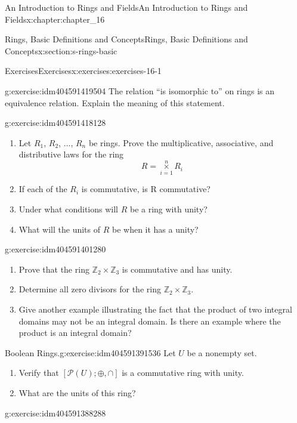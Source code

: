 \documentclass[twoside,10pt,]{book}
\numberwithin{equation}{section}
\begin{document}
\begin{chapterptx}{An Introduction to Rings and Fields}{}{An Introduction to Rings and Fields}{}{}{x:chapter:chapter_16}
\begin{sectionptx}{Rings, Basic Definitions and Concepts}{}{Rings, Basic Definitions and Concepts}{}{}{x:section:s-rings-basic}
\begin{exercises-subsection}{Exercises}{}{Exercises}{}{}{x:exercises:exercises-16-1}
\begin{divisionexercise}{9}{}{}{g:exercise:idm404591419504}
The relation ``is isomorphic to'' on rings is an equivalence relation. Explain the meaning of this statement.%
\end{divisionexercise}%
\begin{divisionexercise}{10}{}{}{g:exercise:idm404591418128}%
%
\begin{enumerate}[label=(\alph*)]
\item{}Let \(R_1\), \(R_2\), \(\ldots\), \(R_n\) be rings. Prove the multiplicative, associative, and distributive laws for the ring%
\begin{equation*}
R=\underset{i=1}{\overset{n}{\times }}R_i
\end{equation*}
%
\item{}If each of the \(R_i\) is commutative, is R commutative?%
\item{}Under what conditions will \(R\) be a ring with unity?%
\item{}What will the units of \(R\) be when it has a unity?%
\end{enumerate}
%
\end{divisionexercise}%
\begin{divisionexercise}{11}{}{}{g:exercise:idm404591401280}%
%
\begin{enumerate}[label=(\alph*)]
\item{}Prove that the ring \(\mathbb{Z}_2 \times \mathbb{Z}_3\) is commutative and has unity.%
\item{}Determine all zero divisors for the ring \(\mathbb{Z}_2 \times \mathbb{Z}_3\).%
\item{}Give another example illustrating the fact that the product of two integral domains may not be an integral domain. Is there an example where the product is an integral domain?%
\end{enumerate}
%
\end{divisionexercise}%
\begin{divisionexercise}{12}{Boolean Rings.}{}{g:exercise:idm404591391536}%
Let \(U\) be a nonempty set.%
\begin{enumerate}[label=(\alph*)]
\item{}Verify that \([\mathcal{P}(U);\oplus ,\cap ]\) is a commutative ring with unity.%
\item{}What are the units of this ring?%
\end{enumerate}
%
\end{divisionexercise}%
\begin{divisionexercise}{13}{}{}{g:exercise:idm404591388288}%
%
\begin{enumerate}[label=(\alph*)]

\end{enumerate}
\end{divisionexercise}
\end{exercises-subsection}
\end{sectionptx}
\end{chapterptx}
\end{document}
